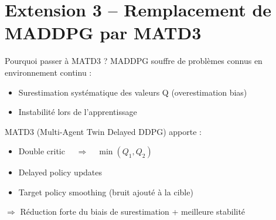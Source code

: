 \documentclass[aspectratio=169]{beamer}
\begin{document}
\section{Extension 3 – Remplacement de MADDPG par MATD3}

\begin{frame}{Pourquoi passer à MATD3 ?}
MADDPG souffre de problèmes connus en environnement continu :

\begin{itemize}
    \item Surestimation systématique des valeurs Q (overestimation bias)
    \item Instabilité lors de l'apprentissage
\end{itemize}

 \bigskip
MATD3 (Multi-Agent Twin Delayed DDPG) apporte :

\begin{itemize}
    \item Double critic $\quad\Rightarrow\quad \min(Q_1, Q_2)$
    \item Delayed policy updates
    \item Target policy smoothing (bruit ajouté à la cible)
\end{itemize}

$\Rightarrow$ Réduction forte du biais de surestimation + meilleure stabilité
\end{frame}
\end{document}

